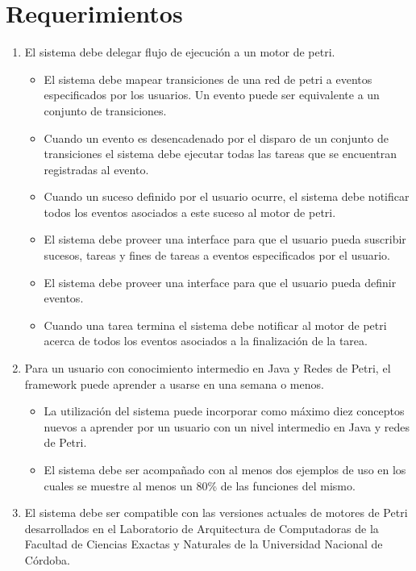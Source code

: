 \section{Requerimientos}

\begin{enumerate}
	\item El sistema debe delegar flujo de ejecución a un motor de
	petri.
	\begin{itemize}
		\item El sistema debe mapear transiciones de una red de petri a eventos
		especificados por los usuarios. Un evento puede ser equivalente a un conjunto de transiciones.
		\item Cuando un evento es desencadenado por el disparo de un conjunto de
		transiciones el sistema debe ejecutar todas las tareas que se encuentran registradas al evento.
		\item Cuando un suceso definido por el usuario ocurre, el sistema debe
		notificar todos los eventos asociados a este suceso al motor de petri.
		\item El sistema debe proveer una interface para que el usuario pueda
		suscribir sucesos, tareas y fines de tareas a eventos especificados por el usuario.
		\item El sistema debe proveer una interface para que el usuario pueda definir
		eventos.
		\item Cuando una tarea termina el sistema debe notificar al motor de petri
		acerca de todos los eventos asociados a la finalización de la tarea.
	\end{itemize}
	\item Para un usuario con conocimiento intermedio en Java y Redes de Petri, el
	framework puede aprender a usarse en una semana o menos.
	\begin{itemize}
	    \item La utilización del sistema puede incorporar como máximo diez
	    conceptos nuevos a aprender por un usuario con un nivel intermedio en Java
	    y redes de Petri.
	    \item El sistema debe ser acompañado con al menos dos ejemplos de uso en
	    los cuales se muestre al menos un 80\% de las funciones del mismo.
	\end{itemize}
	\item El sistema debe ser compatible con las versiones actuales de motores de
	Petri desarrollados en el Laboratorio de Arquitectura de Computadoras de la
	Facultad de Ciencias Exactas y Naturales de la Universidad Nacional de Córdoba.

\end{enumerate}
